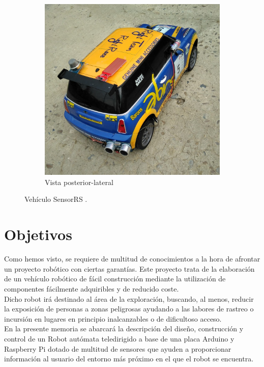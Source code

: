 \begin{figure}[H]
    \begin{subfigure}[c]{0.7\textwidth}
    \begin{center}
        \includegraphics[height=0.5\textwidth]{imagenes/robot/trasera.jpg}
        \end{center}
        \caption{Vista posterior-lateral}
        \label{fig:mouse}
    \end{subfigure}
    \caption{Vehículo SensorRS \protect\footnotemark.}\label{fig:animals}
\end{figure}




\section{Objetivos}
\label{sec:objetivos}

Como hemos visto, se requiere de multitud de conocimientos a la hora de afrontar un proyecto robótico con ciertas garantías. Este proyecto trata de la elaboración 
de un vehículo robótico de fácil construcción mediante la utilización de componentes fácilmente adquiribles y de reducido coste.\\

Dicho robot irá destinado al área de la exploración, buscando, al menos, reducir la exposición de personas a zonas peligrosas ayudando a las labores de rastreo 
o incursión en lugares en principio inalcanzables o de dificultoso acceso.\\

En la presente memoria se abarcará la descripción del diseño, construcción y control de un Robot autómata teledirigido a base de una placa Arduino y Raspberry Pi dotado de multitud
de sensores que ayuden a proporcionar información al usuario del entorno más próximo en el que el robot se encuentra.\\

